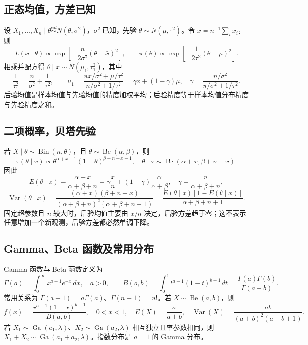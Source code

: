 \subsection{正态均值，方差已知}
设 $X_1,\ldots,X_n\mid\theta\overset{iid}{\sim}N(\theta,\sigma^2)$，$\sigma^2$ 已知，先验 $\theta\sim N(\mu,\tau^2)$。令 $\bar x=n^{-1}\sum_i x_i$，则
\[
L(x\mid\theta)\propto\exp\left[-\frac{n}{2\sigma^2}(\theta-\bar x)^2\right],\qquad
\pi(\theta)\propto\exp\left[-\frac1{2\tau^2}(\theta-\mu)^2\right].
\]
相乘并配方得 $\theta\mid x\sim N(\mu_1,\tau_1^2)$，其中
\[
\frac1{\tau_1^2}=\frac n{\sigma^2}+\frac1{\tau^2},\qquad
\mu_1=\frac{n\bar x/\sigma^2+\mu/\tau^2}{n/\sigma^2+1/\tau^2}
=\gamma\bar x+(1-\gamma)\mu,
\quad \gamma=\frac{n/\sigma^2}{n/\sigma^2+1/\tau^2}.
\]
后验均值是样本均值与先验均值的精度加权平均；后验精度等于样本均值分布精度与先验精度之和。

\subsection{二项概率，贝塔先验}
若 $X\mid\theta\sim\operatorname{Bin}(n,\theta)$，且 $\theta\sim\operatorname{Be}(\alpha,\beta)$，则
\[
\pi(\theta\mid x)\propto\theta^{\alpha+x-1}(1-\theta)^{\beta+n-x-1},\quad
\theta\mid x\sim\operatorname{Be}(\alpha+x,\beta+n-x).
\]
因此
\[
E(\theta\mid x)=\frac{\alpha+x}{\alpha+\beta+n}
=\gamma\frac xn+(1-\gamma)\frac\alpha{\alpha+\beta},\quad
\gamma=\frac n{\alpha+\beta+n},
\]
\[
\operatorname{Var}(\theta\mid x)=
\frac{(\alpha+x)(\beta+n-x)}{(\alpha+\beta+n)^2(\alpha+\beta+n+1)}
=\frac{E(\theta\mid x)[1-E(\theta\mid x)]}{\alpha+\beta+n+1}.
\]
固定超参数且 $n$ 较大时，后验均值主要由 $x/n$ 决定，后验方差趋于零；这不表示任意增加一个新观测，后验方差都必然单调下降。

\subsection{Gamma、Beta 函数及常用分布}
Gamma 函数与 Beta 函数定义为
\[
\Gamma(a)=\int_0^\infty x^{a-1}e^{-x}\,dx,\quad a>0,
\qquad
B(a,b)=\int_0^1t^{a-1}(1-t)^{b-1}\,dt
=\frac{\Gamma(a)\Gamma(b)}{\Gamma(a+b)}.
\]
常用关系为 $\Gamma(a+1)=a\Gamma(a)$、$\Gamma(n+1)=n!$。若 $X\sim\operatorname{Be}(a,b)$，则
\[
f(x)=\frac{x^{a-1}(1-x)^{b-1}}{B(a,b)},\quad 0<x<1,
\quad E(X)=\frac a{a+b},\quad
\operatorname{Var}(X)=\frac{ab}{(a+b)^2(a+b+1)}.
\]
若 $X_1\sim\operatorname{Ga}(a_1,\lambda)$、$X_2\sim\operatorname{Ga}(a_2,\lambda)$ 相互独立且率参数相同，则 $X_1+X_2\sim\operatorname{Ga}(a_1+a_2,\lambda)$。指数分布是 $a=1$ 的 Gamma 分布。

